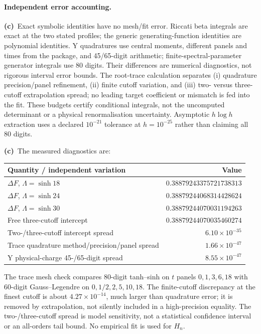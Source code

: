\documentclass[11pt,a4paper]{article}
\newcommand{\Lc}{\textbf{(c)}\ }
\begin{document}
\paragraph{Independent error accounting.}
\Lc Exact symbolic identities have no mesh/fit error. Riccati beta integrals
are exact at the two stated profiles; the generic generating-function
identities are polynomial identities. Y quadratures use central moments,
different panels and times from the package, and 45/65-digit arithmetic;
finite-spectral-parameter generator integrals use 80 digits. Their differences
are numerical diagnostics, not rigorous interval error bounds. The root-trace
calculation separates (i) quadrature precision/panel refinement, (ii) finite
cutoff variation, and (iii) two- versus three-cutoff extrapolation spread;
no leading target coefficient or mismatch is fed into the fit. These budgets
certify conditional integrals, not the uncomputed determinant or a physical
renormalisation uncertainty. Asymptotic $h\log h$ extraction uses a declared
$10^{-21}$ tolerance at $h=10^{-25}$ rather than claiming all 80 digits.

\Lc The measured diagnostics are:
\begin{center}\small
\begin{tabular}{lr}\toprule
Quantity / independent variation & Value\\\midrule
$\Delta F$, $\Lambda=\sinh18$ & $0.38879243375721738313$\\
$\Delta F$, $\Lambda=\sinh24$ & $0.38879244068314428624$\\
$\Delta F$, $\Lambda=\sinh30$ & $0.38879244070031194263$\\
Free three-cutoff intercept & $0.38879244070035460274$\\
Two-/three-cutoff intercept spread & $6.10\times10^{-35}$\\
Trace quadrature method/precision/panel spread & $1.66\times10^{-47}$\\
Y physical-charge 45-/65-digit spread & $8.55\times10^{-47}$\\\bottomrule
\end{tabular}
\end{center}
The trace mesh check compares 80-digit tanh--sinh on $t$ panels
$0,1,3,6,18$ with 60-digit Gauss--Legendre on
$0,1/2,2,5,10,18$. The finite-cutoff discrepancy at the finest cutoff is
about $4.27\times10^{-14}$, much larger than quadrature error; it is removed
by extrapolation, not silently included in a high-precision equality.
The two-/three-cutoff spread is model sensitivity, not a statistical confidence
interval or an all-orders tail bound. No empirical fit is used for $H_n$.
\end{document}
